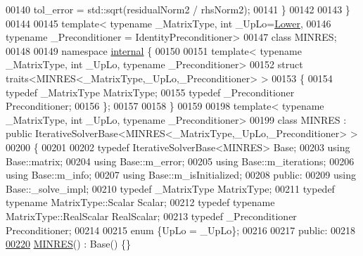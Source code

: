 \begin{DoxyCode}
00140             tol\_error = std::sqrt(residualNorm2 / rhsNorm2);
00141         \}
00142         
00143     \}
00144     
00145     \textcolor{keyword}{template}< \textcolor{keyword}{typename} \_MatrixType, \textcolor{keywordtype}{int} \_UpLo=\hyperlink{group__enums_gga39e3366ff5554d731e7dc8bb642f83cda891792b8ed394f7607ab16dd716f60e6}{Lower},
00146     \textcolor{keyword}{typename} \_Preconditioner = IdentityPreconditioner>
00147     \textcolor{keyword}{class }MINRES;
00148     
00149     \textcolor{keyword}{namespace }\hyperlink{namespaceinternal}{internal} \{
00150         
00151         \textcolor{keyword}{template}< \textcolor{keyword}{typename} \_MatrixType, \textcolor{keywordtype}{int} \_UpLo, \textcolor{keyword}{typename} \_Preconditioner>
00152         \textcolor{keyword}{struct }traits<MINRES<\_MatrixType,\_UpLo,\_Preconditioner> >
00153         \{
00154             \textcolor{keyword}{typedef} \_MatrixType MatrixType;
00155             \textcolor{keyword}{typedef} \_Preconditioner Preconditioner;
00156         \};
00157         
00158     \}
00159     
00198     \textcolor{keyword}{template}< \textcolor{keyword}{typename} \_MatrixType, \textcolor{keywordtype}{int} \_UpLo, \textcolor{keyword}{typename} \_Preconditioner>
00199     \textcolor{keyword}{class }MINRES : \textcolor{keyword}{public} IterativeSolverBase<MINRES<\_MatrixType,\_UpLo,\_Preconditioner> >
00200     \{
00201         
00202         \textcolor{keyword}{typedef} IterativeSolverBase<MINRES> Base;
00203         \textcolor{keyword}{using} Base::matrix;
00204         \textcolor{keyword}{using} Base::m\_error;
00205         \textcolor{keyword}{using} Base::m\_iterations;
00206         \textcolor{keyword}{using} Base::m\_info;
00207         \textcolor{keyword}{using} Base::m\_isInitialized;
00208     \textcolor{keyword}{public}:
00209         \textcolor{keyword}{using} Base::\_solve\_impl;
00210         \textcolor{keyword}{typedef} \_MatrixType MatrixType;
00211         \textcolor{keyword}{typedef} \textcolor{keyword}{typename} MatrixType::Scalar Scalar;
00212         \textcolor{keyword}{typedef} \textcolor{keyword}{typename} MatrixType::RealScalar RealScalar;
00213         \textcolor{keyword}{typedef} \_Preconditioner Preconditioner;
00214         
00215         \textcolor{keyword}{enum} \{UpLo = \_UpLo\};
00216         
00217     \textcolor{keyword}{public}:
00218         
\hyperlink{group___iterative_linear_solvers___module_aa519021be1178a99f5f9ec633de9fc09}{00220}         \hyperlink{group___iterative_linear_solvers___module_aa519021be1178a99f5f9ec633de9fc09}{MINRES}() : Base() \{\}

\end{DoxyCode}
